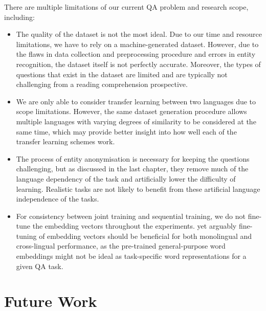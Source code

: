 \documentclass[]{article}
\begin{document}
There are multiple limitations of our current QA problem and research scope, including:
\begin{itemize}
	\item The quality of the dataset is not the most ideal. Due to our time and resource limitations, we have to rely on a machine-generated dataset. However, due to the flaws in data collection and preprocessing procedure and errors in entity recognition, the dataset itself is not perfectly accurate. Moreover, the types of questions that exist in the dataset are limited and are typically not challenging from a reading comprehension prospective.
	\item We are only able to consider transfer learning between two languages due to scope limitations. However, the same dataset generation procedure allows multiple languages with varying degrees of similarity to be considered at the same time, which may provide better insight into how well each of the transfer learning schemes work.
	\item The process of entity anonymisation is necessary for keeping the questions challenging, but as discussed in the last chapter, they remove much of the language dependency of the task and artificially lower the difficulty of learning. Realistic tasks are not likely to benefit from these artificial language independence of the tasks.
	\item For consistency between joint training and sequential training, we do not fine-tune the embedding vectors throughout the experiments. yet arguably fine-tuning of embedding vectors should be beneficial for both monolingual and cross-lingual performance, as the pre-trained general-purpose word embeddings might not be ideal as task-specific word representations for a given QA task.
\end{itemize}


\section{Future Work}
\end{document}
